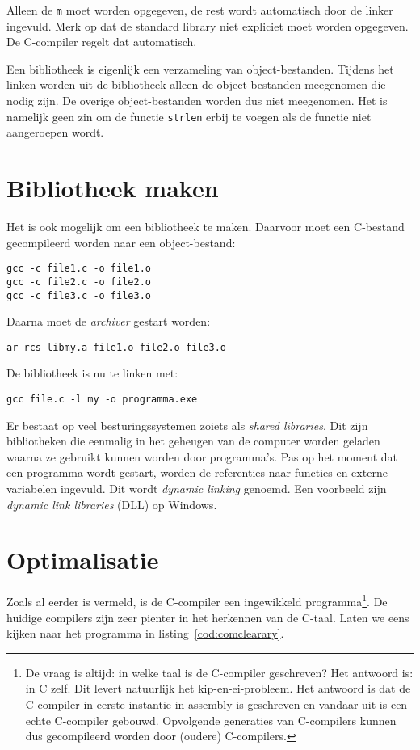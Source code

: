 Alleen de \texttt{m} moet worden opgegeven, de rest wordt automatisch door de linker ingevuld. Merk op dat de standard library niet expliciet moet worden opgegeven. De C-compiler regelt dat automatisch.

Een bibliotheek is eigenlijk een verzameling van object-bestanden. Tijdens het linken worden uit de bibliotheek alleen de object-bestanden meegenomen die nodig zijn. De overige object-bestanden worden dus niet meegenomen. Het is namelijk geen zin om de functie \texttt{strlen} erbij te voegen als de functie niet aangeroepen wordt.


\section{Bibliotheek maken}
Het is ook mogelijk om een bibliotheek te maken. Daarvoor moet een C-bestand gecompileerd worden naar een object-bestand:

\hspace*{1em}\texttt{gcc -c file1.c -o file1.o}\\
\hspace*{1em}\texttt{gcc -c file2.c -o file2.o}\\
\hspace*{1em}\texttt{gcc -c file3.c -o file3.o}

Daarna moet de \textsl{archiver} gestart worden:

\hspace*{1em}\texttt{ar rcs libmy.a file1.o file2.o file3.o}

De bibliotheek is nu te linken met:

\hspace*{1em}\texttt{gcc file.c -l my -o programma.exe}

Er bestaat op veel besturingssystemen zoiets als \textsl{shared libraries}. Dit zijn bibliotheken die eenmalig in het geheugen van de computer worden geladen waarna ze gebruikt kunnen worden door programma's. Pas op het moment dat een programma wordt gestart, worden de referenties naar functies en externe variabelen ingevuld. Dit wordt \textsl{dynamic linking} genoemd. Een voorbeeld zijn \textsl{dynamic link libraries} (DLL) op Windows.


\section{Optimalisatie}
Zoals al eerder is vermeld, is de C-compiler een ingewikkeld programma\footnote{De vraag is altijd: in welke taal is de C-compiler geschreven? Het antwoord is: in C zelf. Dit levert natuurlijk het kip-en-ei-probleem. Het antwoord is dat de C-compiler in eerste instantie in assembly is geschreven en vandaar uit is een echte C-compiler gebouwd. Opvolgende generaties van C-compilers kunnen dus gecompileerd worden door (oudere) C-compilers.}. De huidige compilers zijn zeer pienter in het herkennen van de C-taal. Laten we eens kijken naar het programma in listing~\ref{cod:comclearary}.

